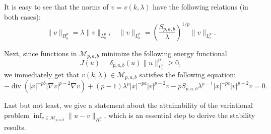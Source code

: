 \documentclass[11pt]{article}
\DeclareMathOperator{\Div}{div}
\numberwithin{equation}{section}
\begin{document}
It is easy to see that the norms of $v=v(k,\lambda)$ have the following relations (in both cases):
\begin{equation}\label{norm of v}
    \|v\|_{H^{p}_b} = \lambda \|v\|_{L^p_a},\quad \|v\|_{L^p_a} = \left(\frac{S_{p,a,b}}{\lambda}\right)^{1/p}\|v\|_{L^p_c}.
\end{equation}

Next, since functions in $\mathcal{M}_{p,a,b}$ minimize the following energy functional
\[ J(u) = \delta_{p,a,b}(u)\|u\|_{L^p_c}^p \ge 0,\]
we immediately get that $v(k,\lambda)\in\mathcal{M}_{p,a,b}$ satisfies the following equation:
\begin{equation}\label{eq}
        -\Div(|x|^{-pb}|\nabla v|^{p-2}\nabla v) + (p-1)\lambda^p|x|^{-pa}|v|^{p-2}v - pS_{p,a,b}\lambda^{p-1}|x|^{-pc}|v|^{p-2}v = 0.
\end{equation}

Last but not least, we give a statement about the attainability of the variational problem $\inf_{v\in\mathcal{M}_{p,a,b}}\|u-v\|_{H_c^p}$, which is an essential step to derive the stability results.

\vskip0.2in
\end{document}
